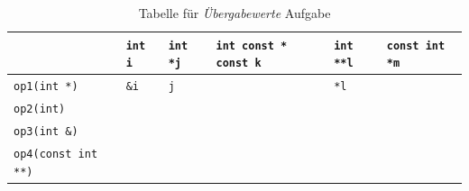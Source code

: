 \begin{table}[h]
    \centering

    \newcolumntype{b}{X}

    \begin{tabularx}{\textwidth}{b *5{| >{\centering\arraybackslash}s}@{}} 
       & \lstinline!int i! & \lstinline!int *j! & \lstinline!int const * const k!  & \lstinline!int **l! & \lstinline!const int *m! \\
	    \hline
		\mbox{\lstinline!op1(int *)!}          & \mbox{\lstinline!&i!} & \mbox{\lstinline!j!} & \xmark & \mbox{\lstinline!*l!} & \xmark \\ 
		\hline
		\mbox{\lstinline!op2(int)!}            & & & & & \\ 
		\hline
		\mbox{\lstinline!op3(int &)!}         & & & & & \\ 
		\hline
		\mbox{\lstinline!op4(const int **)!}   & & & & & 
    \end{tabularx}
    \caption{Tabelle für \emph{Übergabewerte} Aufgabe}
    \label{table:uebergabewerte}
\end{table}
